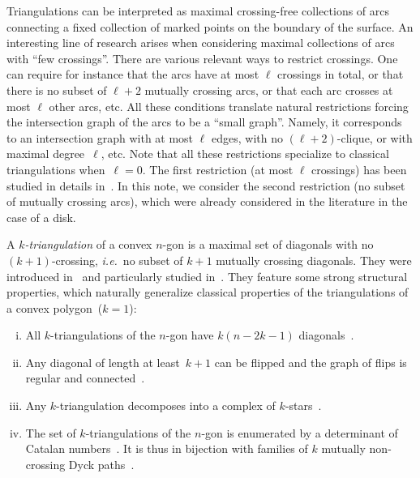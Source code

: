 \documentclass{amsart}
\theoremstyle{remark}
\newcommand{\darkblue}{\color{darkblue}} %
\newcommand{\defn}[1]{\textsl{\darkblue #1}} %
\newcommand{\ie}{\textit{i.e.}~} %
\begin{document}
Triangulations can be interpreted as maximal crossing-free collections of arcs connecting a fixed collection of marked points on the boundary of the surface.
An interesting line of research arises when considering maximal collections of arcs with ``few crossings''.
There are various relevant ways to restrict crossings.
One can require for instance that the arcs have at most $\ell$ crossings in total, or that there is no subset of $\ell+2$ mutually crossing arcs, or that each arc crosses at most $\ell$ other arcs, etc.
All these conditions translate natural restrictions forcing the intersection graph of the arcs to be a ``small graph''.
Namely, it corresponds to an intersection graph with at most $\ell$ edges, with no $(\ell+2)$-clique, or with maximal degree~$\ell$, etc.
Note that all these restrictions specialize to classical triangulations when~$\ell = 0$.
The first restriction (at most $\ell$ crossings) has been studied in details in~\cite{PilaudRue}.
In this note, we consider the second restriction (no subset of mutually crossing arcs), which were already considered in the literature in the case of a disk.

A \defn{$k$-triangulation} of a convex $n$-gon is a maximal set of diagonals with no $(k+1)$-crossing, \ie no subset of $k+1$ mutually crossing diagonals.
They were introduced in~\cite{CapoyleasPach} and particularly studied in~\cite{Nakamigawa, DressKoolenMoulton, Jonsson1, Jonsson2, SerranoStump, PilaudSantos-multitriangulations}.
They feature some strong structural properties, which naturally generalize classical properties of the triangulations of a convex polygon~($k=1$):
\begin{enumerate}[(i)]
\item All $k$-triangulations of the $n$-gon have $k(n-2k-1)$ diagonals~\cite{CapoyleasPach, Nakamigawa, DressKoolenMoulton}.
\item Any diagonal of length at least~$k + 1$ can be flipped and the graph of flips is regular and connected~\cite{Nakamigawa, DressKoolenMoulton}.
\item Any $k$-triangulation decomposes into a complex of $k$-stars~\cite{PilaudSantos-multitriangulations}.
\item The set of $k$-triangulations of the $n$-gon is enumerated by a determinant of Catalan numbers~\cite{Jonsson1, Jonsson2}. It is thus in bijection with families of $k$ mutually non-crossing Dyck paths~\cite{SerranoStump}.
\end{enumerate}
\end{document}
